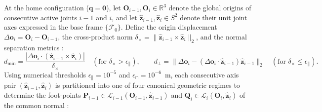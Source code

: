 \documentclass[fleqn,10pt]{article}
\begin{document}
	At the home configuration ($\bm{q} = \bm{0}$), let $\bm{O}_{i-1}, \bm{O}_i \in \mathbb{R}^3$ denote the global origins of consecutive active joints $i-1$ and $i$, and let $\hat{\bm{z}}_{i-1}, \hat{\bm{z}}_i \in S^2$ denote their unit joint axes expressed in the base frame $\{\mathcal{F}_0\}$. Define the origin displacement $\Delta \bm{o}_i = \bm{O}_i - \bm{O}_{i-1}$, the cross-product norm $\delta_\times = \|\hat{\bm{z}}_{i-1} \times \hat{\bm{z}}_i\|_2$, and the normal separation metrics \cite{ihab2026urdf2dt}:
	\begin{equation}
		d_{\min} = \frac{|\Delta \bm{o}_i \cdot (\hat{\bm{z}}_{i-1} \times \hat{\bm{z}}_i)|}{\delta_\times} \quad (\text{for } \delta_\times > \epsilon_\parallel), \qquad d_\perp = \|\Delta \bm{o}_i - (\Delta \bm{o}_i \cdot \hat{\bm{z}}_{i-1})\hat{\bm{z}}_{i-1}\|_2 \quad (\text{for } \delta_\times \le \epsilon_\parallel).
		\label{eq:dh_metrics}
	\end{equation}
	Using numerical thresholds $\epsilon_\parallel = 10^{-5}$ and $\epsilon_\cap = 10^{-6}$~m, each consecutive axis pair $(\hat{\bm{z}}_{i-1}, \hat{\bm{z}}_i)$ is partitioned into one of four canonical geometric regimes to determine the foot-points $\bm{P}_{i-1} \in \mathcal{L}_{i-1}(\bm{O}_{i-1}, \hat{\bm{z}}_{i-1})$ and $\bm{Q}_i \in \mathcal{L}_i(\bm{O}_i, \hat{\bm{z}}_i)$ of the common normal \cite{ihab2026urdf2dt}:
\end{document}
